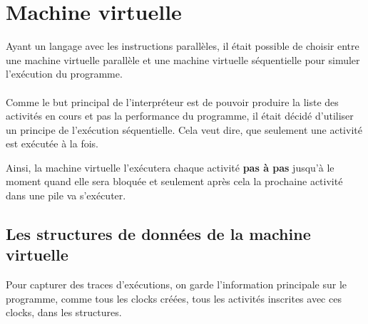 \documentclass[12pt]{scrartcl}
\begin{document}
\section{Machine virtuelle}
Ayant un langage avec les instructions parallèles, il était possible de choisir entre une machine virtuelle parallèle 
et une machine virtuelle séquentielle pour simuler l'exécution du programme. \\\\ Comme le but principal de l'interpréteur est de pouvoir produire la liste des
activités en cours et pas la performance du programme, il était décidé d'utiliser un principe de l'exécution séquentielle. 
Cela veut dire, que seulement une activité est exécutée à la fois. 

Ainsi, la machine virtuelle l'exécutera chaque activité \textbf{pas à pas} jusqu'à le moment quand elle sera bloquée et seulement après cela 
la prochaine activité dans une pile va s'exécuter.

\newpage
\subsection{Les structures de données de la machine virtuelle}

Pour capturer des traces d'exécutions, on garde l'information principale sur le programme,
 comme tous les clocks créées, tous les activités inscrites avec ces clocks, dans les structures.
\end{document}
